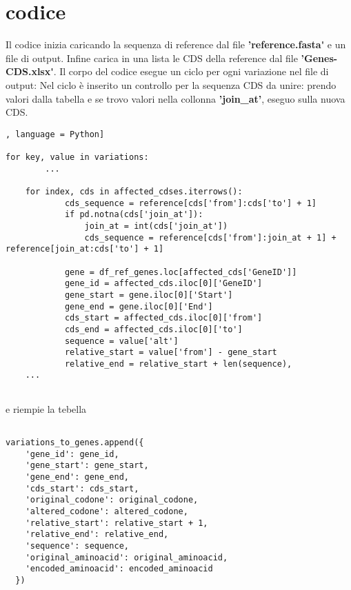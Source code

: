 \documentclass[11pt,italian]{article}
\begin{document}
\section{codice}
	Il codice inizia caricando la sequenza di reference dal file \textbf{'reference.fasta\'} e un file di output.\newline %
	Infine carica in una lista le CDS della reference dal file \textbf{'Genes-CDS.xlsx\'}. \newline
	Il  corpo del codice esegue un ciclo per ogni variazione nel file di output: \newline
	Nel ciclo è inserito un controllo per la sequenza CDS da unire: prendo valori dalla tabella e se trovo valori nella collonna \textbf{'join\_at'}, eseguo sulla nuova CDS. 
	\begin{lstlisting}[basicstyle=\small\ttfamily,caption=Porzione di ciclo,label=code:variations_to_genes = [], language = Python]

for key, value in variations:
        ...
        
	for index, cds in affected_cdses.iterrows():
            cds_sequence = reference[cds['from']:cds['to'] + 1]
            if pd.notna(cds['join_at']):
                join_at = int(cds['join_at'])
                cds_sequence = reference[cds['from']:join_at + 1] + reference[join_at:cds['to'] + 1]
        
            gene = df_ref_genes.loc[affected_cds['GeneID']]
            gene_id = affected_cds.iloc[0]['GeneID']
            gene_start = gene.iloc[0]['Start']
            gene_end = gene.iloc[0]['End']
            cds_start = affected_cds.iloc[0]['from']
            cds_end = affected_cds.iloc[0]['to']
            sequence = value['alt']
            relative_start = value['from'] - gene_start
            relative_end = relative_start + len(sequence),
    ...
  

\end{lstlisting}
\newpage
	e riempie la tebella
\begin{lstlisting}[basicstyle=\small\ttfamily,caption=Appending nel file di output,label=code:variations_to_genes]

variations_to_genes.append({
	'gene_id': gene_id,
	'gene_start': gene_start,
	'gene_end': gene_end,
	'cds_start': cds_start,
	'original_codone': original_codone,
	'altered_codone': altered_codone,
	'relative_start': relative_start + 1,
	'relative_end': relative_end,
	'sequence': sequence,
	'original_aminoacid': original_aminoacid,
	'encoded_aminoacid': encoded_aminoacid
  })

\end{lstlisting}	
\end{document}
